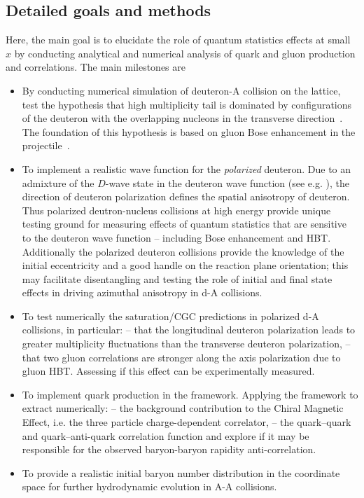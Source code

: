 	


    \vspace{0.5em}
    \subsection{Detailed goals and methods}
        \label{sec:p31}

		Here, the main goal is to elucidate the role of quantum statistics effects at small $x$ by 
		conducting analytical and numerical analysis of quark and gluon production and correlations. 
		The main milestones are 
		\begin{itemize}
			\item By conducting 
				numerical simulation of deuteron-A collision 
				on the lattice, test the hypothesis that high multiplicity tail is dominated by 
				configurations of the deuteron with the overlapping nucleons in the transverse direction~\cite{Kovner:2018azs,Mace:2018vwq}. 
				The foundation of this hypothesis is based on gluon Bose enhancement in the projectile~\cite{Mace:2018vwq}.   
			\item To implement  a realistic wave function for the {\it polarized} deuteron. 
				Due to an admixture of the 
				$D$-wave state in the deuteron wave function (see e.g. \myref\cite{Machleidt:2000ge}), 
				the direction of deuteron polarization defines the spatial
				anisotropy of deuteron. Thus polarized deutron-nucleus collisions 
				at high energy provide unique testing ground  for measuring effects of quantum statistics that are  sensitive to the 
				deuteron wave function -- including Bose enhancement and HBT. Additionally  the polarized deuteron collisions 
				provide the knowledge of the initial eccentricity and a good handle on the reaction plane orientation; 
				this may facilitate disentangling and testing the role of initial and final state effects in driving
				azimuthal anisotropy in d-A collisions.
			\item  To test  numerically the saturation/CGC predictions in polarized d-A collisions, in particular: -- that  the longitudinal 
				deuteron polarization leads to greater multiplicity fluctuations than the transverse deuteron polarization,  --  that 
				two gluon correlations are stronger along the axis polarization due to gluon HBT. Assessing if this effect can be experimentally
				measured.
			\item To implement  quark production in the framework. Applying the framework to extract numerically: -- 
				the background contribution to the Chiral Magnetic Effect, i.e. the three particle charge-dependent correlator, -- 
				the quark--quark and quark--anti-quark correlation function and explore if it may be responsible for the 
				observed baryon-baryon rapidity anti-correlation. 
			\item To provide a realistic 
				initial baryon number  distribution in the coordinate space for further hydrodynamic evolution in A-A collisions. 
		\end{itemize}
		

